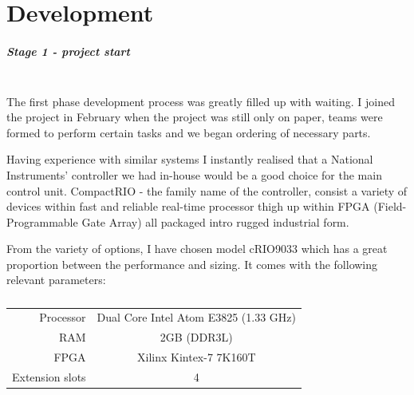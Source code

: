 \chapter{Development}
\paragraph{Stage 1 - project start}   
\addtocounter{section}{1}
\mbox{}\\
The first phase development process was greatly filled up with waiting. I joined the project in February when the project was still only on paper, teams were formed to perform certain tasks and we began ordering of necessary parts.

Having experience with similar systems I instantly realised that a National Instruments' controller we had in-house would be a good choice for the main control unit. CompactRIO - the family name of the controller, consist a variety of devices within fast and reliable real-time processor thigh up within FPGA (Field-Programmable Gate Array) all packaged intro rugged industrial form.

From the variety of options, I have chosen model cRIO9033 which has a great proportion between the performance and sizing. It comes with the following relevant parameters:
\begin{table}[H]
    \centering
    \begin{tabular}{r|c}
        Processor & Dual Core Intel Atom E3825 (1.33 GHz) \\
        RAM & 2GB (DDR3L) \\
        FPGA & Xilinx Kintex-7 7K160T \\
        Extension slots & 4
    \end{tabular}
    \caption*{}
    \label{tab:cRIO_param}
    \vspace{-20pt}
\end{table}

